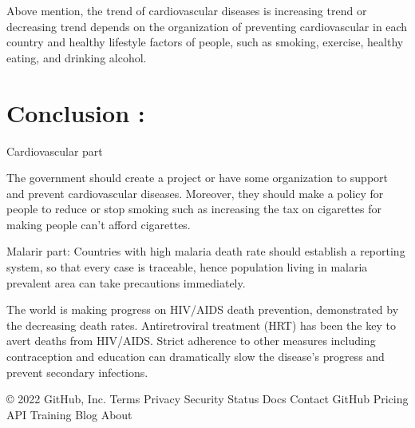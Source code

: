 \documentclass[11pt,a4paper,]{article}
\begin{document}
Above mention, the trend of cardiovascular diseases is increasing trend or decreasing trend depends on the organization of preventing cardiovascular in each country and healthy lifestyle factors of people, such as smoking, exercise, healthy eating, and drinking alcohol.

\clearpage

\hypertarget{conclusion-1}{%
\section{Conclusion :}\label{conclusion-1}}

Cardiovascular part

The government should create a project or have some organization to support and prevent cardiovascular diseases. Moreover, they should make a policy for people to reduce or stop smoking such as increasing the tax on cigarettes for making people can't afford cigarettes.

Malarir part:
Countries with high malaria death rate should establish a reporting system, so that every case is traceable, hence population living in malaria prevalent area can take precautions immediately.

The world is making progress on HIV/AIDS death prevention, demonstrated by the decreasing death rates. Antiretroviral treatment (HRT) has been the key to avert deaths from HIV/AIDS. Strict adherence to other measures including contraception and education can dramatically slow the disease's progress and prevent secondary infections.

\clearpage

© 2022 GitHub, Inc.
Terms
Privacy
Security
Status
Docs
Contact GitHub
Pricing
API
Training
Blog
About

\printbibliography
\end{document}
